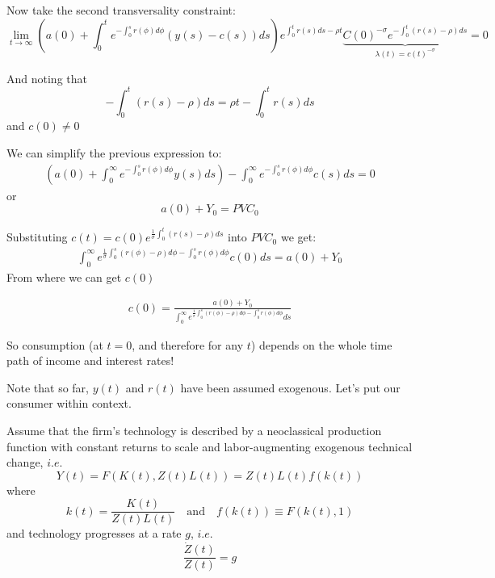 \documentclass[aspectratio=169]{beamer}
\begin{document}
\begin{frame}
    Now take the second transversality constraint:
    {\scriptsize
    \[\lim_{t\rightarrow\infty}\left(a(0)+\int_0^t e^{-\int_0^sr(\phi)d\phi} (y(s)-c(s))ds\right)e^{\int_0^tr(s)ds-\rho t}\underbrace{C(0)^{-\sigma}e^{-\int_0^t(r(s)-\rho)ds}}_{\lambda(t)=c(t)^{-\sigma}}= 0\]
    }
    
    And noting that \[-\int_0^t(r(s)-\rho)ds=\rho t - \int_0^t r(s)ds\] and $c(0)\neq 0$
    
    We can simplify the previous expression to:
    {\small
    \begin{align}
        \left(a(0)+\int_0^\infty e^{-\int_0^s r(\phi)d\phi}y(s)ds\right)-\int_0^\infty e^{-\int_0^s r(\phi)d\phi}c(s)ds=0
    \end{align}
    } or
    \[a(0)+Y_0=PVC_0\]
\end{frame}

\begin{frame}
Substituting $c(t)=c(0)e^{\frac{1}{\sigma}\int_0^t (r(s)-\rho) ds}$ into $PVC_0$ we get:
\begin{align*}
    \int_0^\infty e^{\frac{1}{\sigma}\int_0^s (r(\phi)-\rho)d\phi-\int_0^s r(\phi)d\phi}c(0)ds = a(0)+Y_0
\end{align*}
    From where we can get $c(0)$
    
    \begin{align}
        c(0)=\frac{a(0)+Y_0}{\int_0^\infty e^{\frac{1}{\sigma}\int_0^s (r(\phi)-\rho)d\phi-\int_0^s r(\phi)d\phi}ds}
    \end{align}
    
    So consumption (at $t=0$, and therefore for any $t$) depends on the whole time path of income and interest rates!
\end{frame}

\begin{frame}

    Note that so far, $y(t)$ and $r(t)$ have been assumed exogenous. Let's put our consumer within context.

\end{frame}

\begin{frame}

    Assume that the firm's technology is described by a neoclassical production function with constant returns to scale and labor-augmenting exogenous technical change, $i.e.$ \[Y(t)=F(K(t),Z(t)L(t))=Z(t)L(t)f(k(t))\] where \[k(t)=\frac{K(t)}{Z(t)L(t)}\quad\text{and}\quad f(k(t))\equiv F(k(t),1)\] and technology progresses at a rate $g$, $i.e.$ \[\frac{\dot{Z}(t)}{Z(t)}=g\]

\end{frame}
\end{document}

